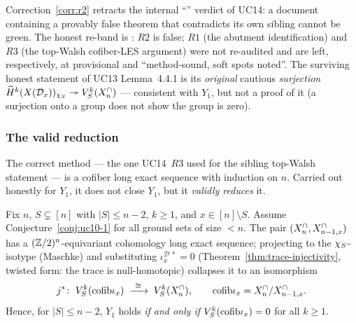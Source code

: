 \begin{remark}
\label{rem:r2-lesson}
Correction~\ref{corr:r2} retracts the internal ``'' verdict of UC14: a document containing a provably false
theorem that contradicts its own sibling cannot be green. The honest
re-band is : $R2$ is false; $R1$ (the
abutment identification) and $R3$ (the top-Walsh cofiber-LES argument)
were not re-audited and are left, respectively, at provisional and
``method-sound, soft spots noted''. The surviving honest statement of
UC13 Lemma~4.4.1 is its \emph{original} cautious \emph{surjection}
$\widetilde H^k(X(\mathcal{D}_x))_{\chi_{S}}\twoheadrightarrow V_{S}^{k}(X^{\cap}_n)$ --- consistent with $Y_1$, but not a proof of it (a surjection
onto a group does not show the group is zero).
\end{remark}

\subsubsection{The valid reduction}

The correct method --- the one UC14~$R3$ used for the sibling
top-Walsh statement --- is a cofiber long exact sequence with induction
on $n$. Carried out honestly for $Y_1$, it does not close $Y_1$, but it
\emph{validly reduces} it.

\begin{theorem}
\label{thm:y1-reduction}
Fix $n$, $S\subsetneq[n]$ with $|S|\le n-2$, $k\ge1$, and
$x\in[n]\setminus S$. Assume Conjecture~\ref{conj:uc10-1} for all
ground sets of size $<n$. The pair $(X^{\cap}_n,X^{\cap}_{n-1,x})$ has a
$(\mathbb{Z}/2)^n$-equivariant cohomology long exact sequence; projecting to
the $\chi_{S}$-isotype \textup(Maschke\textup) and substituting
$\iota_x^{\mathcal D\,*}=0$ \textup(Theorem~\ref{thm:trace-injectivity},
twisted form: the trace is null-homotopic\textup) collapses it to an
isomorphism
\[
  j^{*}\colon\;V_{S}^{k}(\mathrm{cofib}\iota_x)\;\xrightarrow{\ \cong\ }\;
  V_{S}^{k}(X^{\cap}_n),\qquad \mathrm{cofib}\iota_x=X^{\cap}_n/X^{\cap}_{n-1,x}.
\]
Hence, for $|S|\le n-2$, $Y_1$ holds \emph{if and only if}
$V_{S}^{k}(\mathrm{cofib}\iota_x)=0$ for all $k\ge1$.
\end{theorem}

